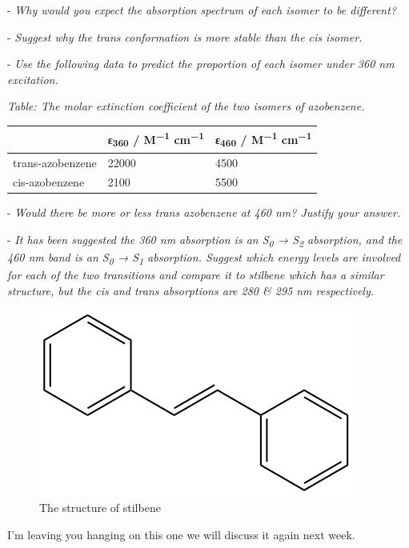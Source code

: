 \documentclass[
]{book}
\begin{document}
- \emph{Why would you expect the absorption spectrum of each isomer to be different?}

- \emph{Suggest why the trans conformation is more stable than the cis isomer.}

- \emph{Use the following data to predict the proportion of each isomer under 360 nm excitation.}

\emph{Table: \label{tab:azobenzeneabs} The molar extinction coefficient of the two isomers of azobenzene.}

\begin{longtable}[]{@{}lll@{}}
\toprule
& ε\textsubscript{360} / M\textsuperscript{−1} cm\textsuperscript{−1} & ε\textsubscript{460} / M\textsuperscript{−1} cm\textsuperscript{−1}\tabularnewline
\midrule
\endhead
trans-azobenzene & 22000 & 4500\tabularnewline
cis-azobenzene & 2100 & 5500\tabularnewline
\bottomrule
\end{longtable}

- \emph{Would there be more or less trans azobenzene at 460 nm? Justify your answer.}

- \emph{It has been suggested the 360 nm absorption is an S\textsubscript{0} → S\textsubscript{2} absorption, and the 460 nm band is an S\textsubscript{0} → S\textsubscript{1} absorption. Suggest which energy levels are involved for each of the two transitions and compare it to stilbene which has a similar structure, but the cis and trans absorptions are 280 \& 295 nm respectively.}

\begin{figure}

{\centering \includegraphics[width=0.3\linewidth]{images/stilbene} 

}

\caption{The  structure of stilbene}\label{fig:stilbene}
\end{figure}

I'm leaving you hanging on this one we will discuss it again next week.

  
\end{document}
